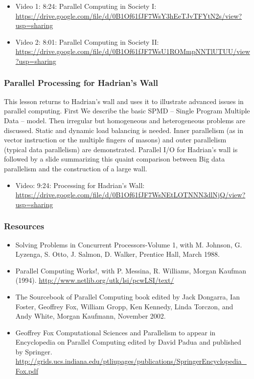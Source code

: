 \begin{itemize}
\tightlist
\item
  Video 1: 8:24: Parallel Computing in Society I:
  \url{https://drive.google.com/file/d/0B1Of61fJF7WsY3hEeTJvTFYtN2s/view?usp=sharing}
\item
  Video 2: 8:01: Parallel Computing in Society II:
  \url{https://drive.google.com/file/d/0B1Of61fJF7WsU1ROMmpNNTlUTUU/view?usp=sharing}
\end{itemize}

\subsubsection{Parallel Processing for Hadrian's
Wall}\label{parallel-processing-for-hadrians-wall}

This lesson returns to Hadrian's wall and uses it to illustrate advanced
issues in parallel computing. First We describe the basic SPMD -- Single
Program Multiple Data -- model. Then irregular but homogeneous and
heterogeneous problems are discussed. Static and dynamic load balancing
is needed. Inner parallelism (as in vector instruction or the multiple
fingers of masons) and outer parallelism (typical data parallelism) are
demonstrated. Parallel I/O for Hadrian's wall is followed by a slide
summarizing this quaint comparison between Big data parallelism and the
construction of a large wall.

\begin{itemize}
\tightlist
\item
  Video: 9:24: Processing for Hadrian's Wall:
  \url{https://drive.google.com/file/d/0B1Of61fJF7WsNEtLOTNNN3dlNjQ/view?usp=sharing}
\end{itemize}

\subsubsection{Resources}\label{resources}

\begin{itemize}
\tightlist
\item
  Solving Problems in Concurrent Processors-Volume 1, with M. Johnson,
  G. Lyzenga, S. Otto, J. Salmon, D. Walker, Prentice Hall, March 1988.
\item
  Parallel Computing Works!, with P. Messina, R. Williams, Morgan
  Kaufman (1994). \url{http://www.netlib.org/utk/lsi/pcwLSI/text/}
\item
  The Sourcebook of Parallel Computing book edited by Jack Dongarra, Ian
  Foster, Geoffrey Fox, William Gropp, Ken Kennedy, Linda Torczon, and
  Andy White, Morgan Kaufmann, November 2002.
\item
  Geoffrey Fox Computational Sciences and Parallelism to appear in
  Encyclopedia on Parallel Computing edited by David Padua and published
  by Springer.
  \url{http://grids.ucs.indiana.edu/ptliupages/publications/SpringerEncyclopedia_Fox.pdf}
\end{itemize}

